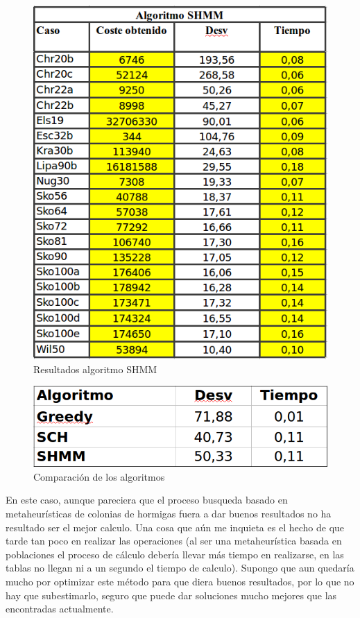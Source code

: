 \begin{figure}[H]
\centering
\includegraphics[scale=.60]{scmm.png}
\caption{Resultados algoritmo SHMM}
\label{}
\end{figure}



\begin{figure}[H]
\centering
\includegraphics[scale=.40]{total.png}
\caption{Comparación de los algoritmos}
\label{}
\end{figure}

En este caso, aunque pareciera que el proceso busqueda basado en metaheurísticas de colonias de hormigas fuera a dar buenos resultados no ha resultado ser el mejor calculo. Una cosa que aún me inquieta es el hecho de que tarde tan poco en realizar las operaciones (al ser una metaheurística basada en poblaciones el proceso de cálculo debería llevar más tiempo en realizarse, en las tablas no llegan ni a un segundo el tiempo de calculo). Supongo que aun quedaría mucho por optimizar este método para que diera buenos resultados, por lo que no hay que subestimarlo, seguro que puede dar soluciones mucho mejores que las encontradas actualmente.\\

